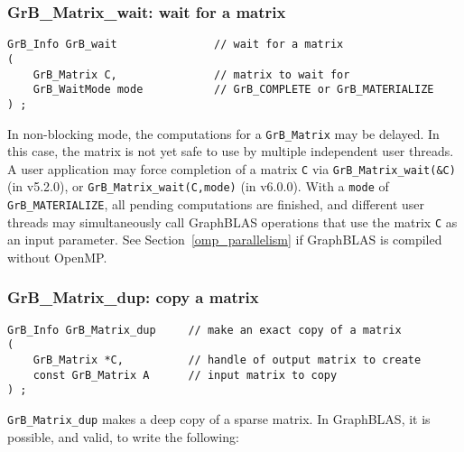 \documentclass[12pt]{article}
\begin{document}
\subsubsection{{\sf GrB\_Matrix\_wait:} wait for a matrix}
\label{matrix_wait}

\begin{mdframed}[userdefinedwidth=6in]
{\footnotesize
\begin{verbatim}
GrB_Info GrB_wait               // wait for a matrix
(
    GrB_Matrix C,               // matrix to wait for
    GrB_WaitMode mode           // GrB_COMPLETE or GrB_MATERIALIZE
) ;
\end{verbatim}
}\end{mdframed}

In non-blocking mode, the computations for a \verb'GrB_Matrix' may be delayed.
In this case, the matrix is not yet safe to use by multiple independent user
threads.  A user application may force completion of a matrix \verb'C' via
\verb'GrB_Matrix_wait(&C)' (in v5.2.0), or
\verb'GrB_Matrix_wait(C,mode)' (in v6.0.0).
With a \verb'mode' of \verb'GrB_MATERIALIZE',
all pending computations are finished, and different user threads may
simultaneously call GraphBLAS operations that use the matrix \verb'C' as an
input parameter.
See Section~\ref{omp_parallelism}
if GraphBLAS is compiled without OpenMP.

\newpage
\subsubsection{{\sf GrB\_Matrix\_dup:}          copy a matrix}
\label{matrix_dup}

\begin{mdframed}[userdefinedwidth=6in]
{\footnotesize
\begin{verbatim}
GrB_Info GrB_Matrix_dup     // make an exact copy of a matrix
(
    GrB_Matrix *C,          // handle of output matrix to create
    const GrB_Matrix A      // input matrix to copy
) ;
\end{verbatim} } \end{mdframed}

\verb'GrB_Matrix_dup' makes a deep copy of a sparse matrix.
In GraphBLAS, it is possible, and valid, to write the following:
\end{document}
